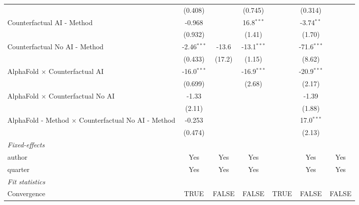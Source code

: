 \begin{tabular}{lcccccc}
                                                              & (0.408)       &              & (0.745)       &      & (0.314)       &   \\   
   Counterfactual AI - Method                                 & -0.968        &              & 16.8$^{***}$  &      & -3.74$^{**}$  &   \\   
                                                              & (0.932)       &              & (1.41)        &      & (1.70)        &   \\   
   Counterfactual No AI - Method                              & -2.46$^{***}$ & -13.6        & -13.1$^{***}$ &      & -71.6$^{***}$ &   \\   
                                                              & (0.433)       & (17.2)       & (1.15)        &      & (8.62)        &   \\   
   AlphaFold $\times$ Counterfactual AI                       & -16.0$^{***}$ &              & -16.9$^{***}$ &      & -20.9$^{***}$ &   \\   
                                                              & (0.699)       &              & (2.68)        &      & (2.17)        &   \\   
   AlphaFold $\times$ Counterfactual No AI                    & -1.33         &              &               &      & -1.39         &   \\   
                                                              & (2.11)        &              &               &      & (1.88)        &   \\   
   AlphaFold - Method $\times$ Counterfactual No AI - Method  & -0.253        &              &               &      & 17.0$^{***}$  &   \\   
                                                              & (0.474)       &              &               &      & (2.13)        &   \\   
   \midrule
   \emph{Fixed-effects}\\
   author                                                     & Yes           & Yes          & Yes           &      & Yes           & Yes\\  
   quarter                                                    & Yes           & Yes          & Yes           &      & Yes           & Yes\\  
   \midrule
   \emph{Fit statistics}\\
   Convergence                                                &TRUE           & FALSE        & FALSE         & TRUE & FALSE         & FALSE\\  

\end{tabular}
